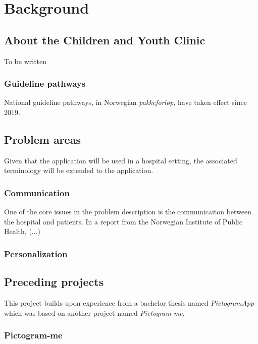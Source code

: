 \chapter{Background}
\label{ch:background}

\section{About the Children and Youth Clinic}
\label{sec:abouttheclinic}

To be written

\subsection{Guideline pathways}

National guideline pathways, in Norwegian \emph{pakkeforløp}, have taken effect since 2019. 

\section{Problem areas}
\label{sec:problemareas}

Given that the application will be used in a hospital setting, the associated terminology will be extended to the application.

\subsection{Communication}

One of the core issues in the problem description is the communicaiton between the hospital and patients. In a report from the Norwegian Institute of Public Health, \textcite{ask2015} (...)

\subsection{Personalization}

\section{Preceding projects}

This project builds upon experience from a bachelor thesis named \emph{PictogramApp} which was based on another project named \emph{Pictogram-me}.

\subsection{Pictogram-me}

